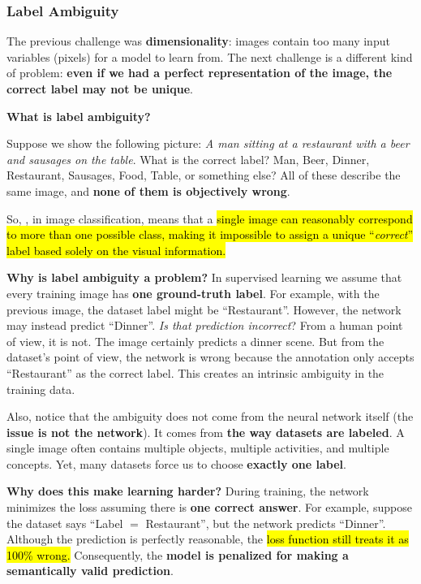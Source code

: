 \subsubsection{Label Ambiguity}\label{sec:label-ambiguity}

The previous challenge was \textbf{dimensionality}: images contain too many input variables (pixels) for a model to learn from. The next challenge is a different kind of problem: \textbf{even if we had a perfect representation of the image, the correct label may not be unique}.

\highspace
\begin{flushleft}
    \textcolor{Green3}{ \textbf{What is label ambiguity?}}
\end{flushleft}
Suppose we show the following picture: \emph{A man sitting at a restaurant with a beer and sausages on the table}. What is the correct label? Man, Beer, Dinner, Restaurant, Sausages, Food, Table, or something else? All of these describe the same image, and \textbf{none of them is objectively wrong}.

\highspace
So, , in image classification, means that a \hl{single image can reasonably correspond to more than one possible class, making it impossible to assign a unique ``\emph{correct}'' label based solely on the visual information.}

\highspace
\textcolor{Red2}{ \textbf{Why is label ambiguity a problem?}} In supervised learning we assume that every training image has \textbf{one ground-truth label}. For example, with the previous image, the dataset label might be ``Restaurant''. However, the network may instead predict ``Dinner''. \emph{Is that prediction incorrect}? From a human point of view, it is not. The image certainly predicts a dinner scene. But from the dataset's point of view, the network is wrong because the annotation only accepts ``Restaurant'' as the correct label. This creates an intrinsic ambiguity in the training data.

\highspace
Also, notice that the ambiguity does not come from the neural network itself (the \textbf{issue is not the network}). It comes from \textbf{the way datasets are labeled}. A single image often contains multiple objects, multiple activities, and multiple concepts. Yet, many datasets force us to choose \textbf{exactly one label}.

\highspace
\textcolor{Red2}{ \textbf{Why does this make learning harder?}} During training, the network minimizes the loss assuming there is \textbf{one correct answer}. For example, suppose the dataset says ``Label $=$ Restaurant'', but the network predicts ``Dinner''. Although the prediction is perfectly reasonable, the \hl{loss function still treats it as 100\% wrong.} Consequently, the \textbf{model is penalized for making a semantically valid prediction}.

